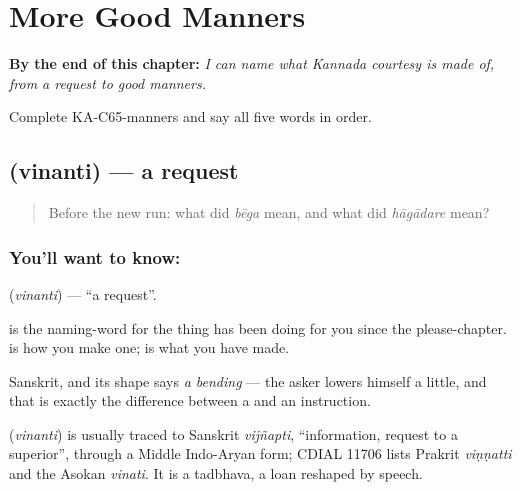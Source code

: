 
\chapter{More Good Manners}
\label{ch:ka-manners}

\begin{chapteropening}
\textbf{By the end of this chapter:} \emph{I can name what Kannada courtesy is made of, from a request to good manners.}

Complete KA-C65-manners and say all five words in order.
\end{chapteropening}

\section[\texorpdfstring{\kn{ವಿನಂತಿ} (vinanti)}{ವಿನಂತಿ (vinanti)}]{ (vinanti) — a request}

\label{lesson:KA-C65-request}



\begin{quote}
Before the new run: what did \emph{bēga} mean, and what did \emph{hāgādare} mean?
\end{quote}

\subsection*{You'll want to know: }
\textbf{} (\emph{vinanti}) — \textquotedblleft{}a request\textquotedblright{}.

 is the naming-word for the thing  has been doing for you since the please-chapter.  is how you make one;  is what you have made.

Sanskrit, and its shape says \emph{a bending} — the asker lowers himself a little, and that is exactly the difference between a  and an instruction.

\begin{cousinweb}
\textbf{} (\emph{vinanti}) is usually traced to Sanskrit \emph{vijñapti}, \textquotedblleft{}information, request to a superior\textquotedblright{}, through a Middle Indo-Aryan form; CDIAL 11706 lists Prakrit \emph{viṇṇatti} and the Asokan \emph{vinati}. It is a tadbhava, a loan reshaped by speech.
\end{cousinweb}

